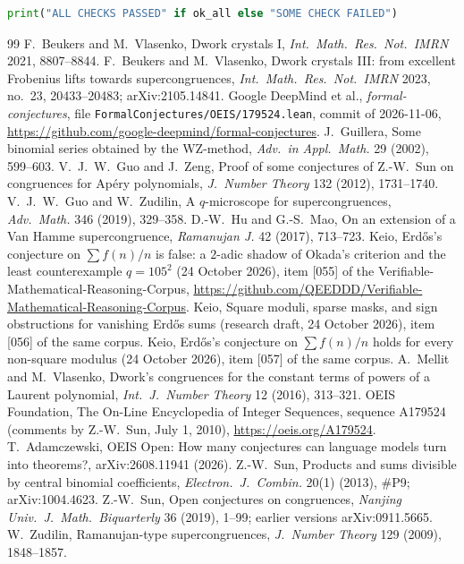 \documentclass[11pt]{amsart}
\theoremstyle{definition}
\begin{document}
\begin{lstlisting}[language=Python]
print("ALL CHECKS PASSED" if ok_all else "SOME CHECK FAILED")
\end{lstlisting}

\begin{thebibliography}{99}
 F.~Beukers and M.~Vlasenko, Dwork crystals I, \emph{Int.\ Math.\ Res.\ Not.\ IMRN}
2021, 8807--8844.
 F.~Beukers and M.~Vlasenko, Dwork crystals III: from excellent Frobenius lifts towards
supercongruences, \emph{Int.\ Math.\ Res.\ Not.\ IMRN} 2023, no.~23, 20433--20483;
arXiv:2105.14841.
 Google DeepMind et al., \emph{formal-conjectures}, file
\texttt{FormalConjectures/OEIS/179524.lean}, commit of 2026-11-06,
\url{https://github.com/google-deepmind/formal-conjectures}.
 J.~Guillera, Some binomial series obtained by the WZ-method,
\emph{Adv.\ in Appl.\ Math.} 29 (2002), 599--603.
 V.~J.~W.~Guo and J.~Zeng, Proof of some conjectures of Z.-W.~Sun on congruences for
Ap\'ery polynomials, \emph{J.\ Number Theory} 132 (2012), 1731--1740.
 V.~J.~W.~Guo and W.~Zudilin, A $q$-microscope for supercongruences,
\emph{Adv.\ Math.} 346 (2019), 329--358.
 D.-W.~Hu and G.-S.~Mao, On an extension of a Van Hamme supercongruence,
\emph{Ramanujan J.} 42 (2017), 713--723.
 Keio, Erd\H{o}s's conjecture on $\sum f(n)/n$ is false: a $2$-adic shadow of Okada's
criterion and the least counterexample $q=105^2$ (24 October 2026), item [055] of the
Verifiable-Mathematical-Reasoning-Corpus, \url{https://github.com/QEEDDD/Verifiable-Mathematical-Reasoning-Corpus}.
 Keio, Square moduli, sparse masks, and sign obstructions for vanishing Erd\H{o}s sums
(research draft, 24 October 2026), item [056] of the same corpus.
 Keio, Erd\H{o}s's conjecture on $\sum f(n)/n$ holds for every non-square modulus
(24 October 2026), item [057] of the same corpus.
 A.~Mellit and M.~Vlasenko, Dwork's congruences for the constant terms of powers of a
Laurent polynomial, \emph{Int.\ J.\ Number Theory} 12 (2016), 313--321.
 OEIS Foundation, The On-Line Encyclopedia of Integer Sequences, sequence A179524
(comments by Z.-W.~Sun, July 1, 2010), \url{https://oeis.org/A179524}.
 T.~Adamczewski, OEIS Open: How many conjectures can language models turn into
theorems?, arXiv:2608.11941 (2026).
 Z.-W.~Sun, Products and sums divisible by central binomial coefficients,
\emph{Electron.\ J.\ Combin.} 20(1) (2013), \#P9; arXiv:1004.4623.
 Z.-W.~Sun, Open conjectures on congruences, \emph{Nanjing Univ.\ J.\ Math.\
Biquarterly} 36 (2019), 1--99; earlier versions arXiv:0911.5665.
\bibitem{Zu} W.~Zudilin, Ramanujan-type supercongruences, \emph{J.\ Number Theory} 129 (2009),
1848--1857.
\end{thebibliography}
\end{document}
